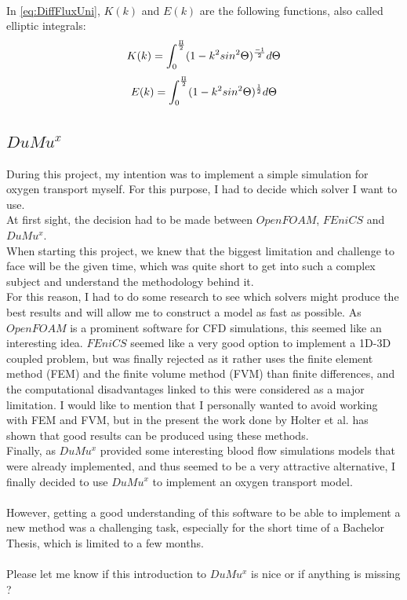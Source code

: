 \\In \ref{eq:DiffFluxUni}, $K(k)$ and $E(k)$ are the following functions, also called elliptic integrals:
%
\begin{equation}
\\K(k) = \int_{0}^{\frac{\Pi}{2}} (1 - k^2 sin^2 \Theta)^ \frac{-1}{2} d \Theta
\label{eq:EllipInt1}
\end{equation}
%
\begin{equation}
\\E(k) = \int_{0}^{\frac{\Pi}{2}} (1 - k^2 sin^2 \Theta)^ \frac{1}{2} d \Theta
\label{eq:EllipInt2}
\end{equation}

\newpage
\subsection{$DuMu^x$}
\label{$DuMu^x$}

During this project, my intention was to implement a simple simulation for oxygen transport myself. For this purpose, I had to decide which solver I want to use.\\
At first sight, the decision had to be made between $OpenFOAM$, $FEniCS$ and $DuMu^x$.
\\When starting this project, we knew that the biggest limitation and challenge to face will be the given time, which was quite short to get into such a complex subject and understand the methodology behind it.
\\For this reason, I had to do some research to see which solvers might produce the best results and will allow me to construct a model as fast as possible. As $OpenFOAM$ is a prominent software for CFD simulations, this seemed like an interesting idea. $FEniCS$ seemed like a very good option to implement a 1D-3D coupled problem, but was finally rejected as it rather uses the finite element method (FEM) and the finite volume method (FVM) than finite differences, and the computational disadvantages linked to this were considered as a major limitation. I would like to mention that I personally wanted to avoid working with FEM and FVM, but in the present the work done by Holter et al. \cite {holter2018sub} has shown that good results can be produced using these methods.
\\Finally, as $DuMu^x$ provided some interesting blood flow simulations models that were already implemented, and thus seemed to be a very attractive alternative, I finally decided to use $DuMu^x$ to implement an oxygen transport model.\\
\\However, getting a good understanding of this software to be able to implement a new method was a challenging task, especially for the short time of a Bachelor Thesis, which is limited to a few months.
\\
\\ {\color{red}Please let me know if this introduction to $DuMu^x$ is nice or if anything is missing ?}

